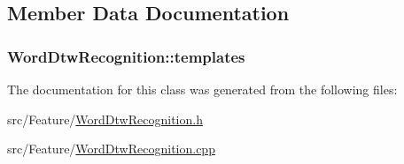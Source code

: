 \subsection{Member Data Documentation}
\hypertarget{class_word_dtw_recognition_a1c3086c9382b4bd282230044b15b3d01}{
\subsubsection[{templates}]{ Word\+Dtw\+Recognition\+::templates\hspace{0.3cm}{\ttfamily [private]}}}\label{class_word_dtw_recognition_a1c3086c9382b4bd282230044b15b3d01}


The documentation for this class was generated from the following files\+:\begin{DoxyCompactItemize}
\item 
src/\+Feature/\hyperlink{_word_dtw_recognition_8h}{Word\+Dtw\+Recognition.\+h}\item 
src/\+Feature/\hyperlink{_word_dtw_recognition_8cpp}{Word\+Dtw\+Recognition.\+cpp}\end{DoxyCompactItemize}
